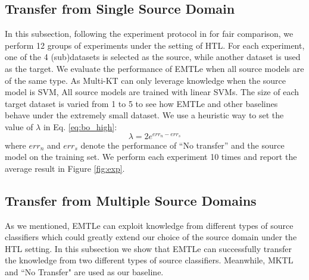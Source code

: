 \subsection{Transfer from Single Source Domain}
In this subsection, following the experiment protocol in \cite{jie2011multiclass,tommasi2014learning} for fair comparison, we perform 12 groups of experiments under the setting of HTL. 
For each experiment, one of the 4 (sub)datasets is selected as the source, while another dataset is used as the target. We evaluate the performance of EMTLe when all source models are of the same type. As Multi-KT can only leverage knowledge when the source model is SVM, All source models are trained with linear SVMs.
The size of each target dataset is varied from 1 to 5 to see how EMTLe and other baselines behave under the extremely small dataset. We use a heuristic way to set the value of $\lambda$ in Eq. \eqref{eq:bo_high}:
\begin{equation}
\lambda = 2e^{err_{n}-err_{s}}
\end{equation}
where $err_{n}$ and $err_{s}$ denote the performance of ``No transfer'' and the source model on the training set.
We perform each experiment 10 times and report the average result in Figure \ref{fig:exp}. 


\subsection{Transfer from Multiple Source Domains}
As we mentioned, EMTLe can exploit knowledge from different types of source classifiers which could greatly extend our choice of the source domain under the HTL setting. In this subsection we show that EMTLe can successfully transfer the knowledge from two different types of source classifiers. Meanwhile, MKTL and ``No Transfer" are used as our baseline. 

